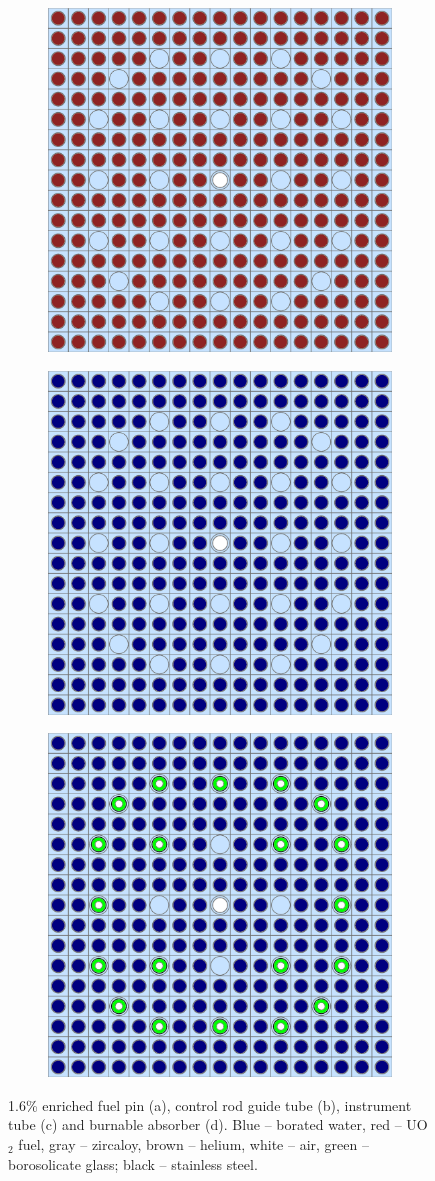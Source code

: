 \begin{figure}[H]
\centering
\begin{subfigure}{\textwidth}
  \centering
  \includegraphics[width=0.4\linewidth]{figures/benchmarks/assembly-16}
  \caption{}
  \label{fig:chap7-assm-16}
\end{subfigure}
\begin{subfigure}{\textwidth}
  \centering
  \includegraphics[width=0.4\linewidth]{figures/benchmarks/assembly-31}
  \caption{}
  \label{fig:chap7-assm-31}
\end{subfigure}
\begin{subfigure}{\textwidth}
  \centering
  \includegraphics[width=0.4\linewidth]{figures/benchmarks/assembly-31-20BAs}
  \caption{}
  \label{fig:chap7-assm-31-20BAs}
\end{subfigure}%
\caption[BEAVRS fuel assembly geometries]{1.6\% enriched fuel pin (a), control rod guide tube (b), instrument tube (c) and burnable absorber (d). Blue -- borated water, red -- UO$_2$ fuel, gray -- zircaloy, brown -- helium, white -- air, green -- borosolicate glass; black -- stainless steel.}
\label{fig:chap7-fuel-assms}
\end{figure}


